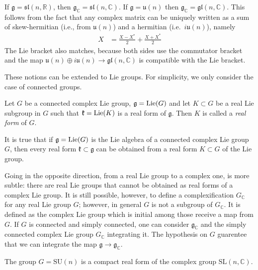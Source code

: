 \documentclass[12pt]{article}
\begin{document}
\begin{example}
    If
    $\mathfrak g=\mathfrak{sl}(n,\mathbb R)$, then
    $\mathfrak g_{\mathbb C}=\mathfrak{sl}(n,\mathbb C)$.
    If $\mathfrak g=\mathfrak u(n)$ then $\mathfrak g_{\mathbb C}
        =\mathfrak{gl}(n,\mathbb C)$. This follows from the fact that any complex matrix can be uniquely written as a sum of skew-hermitian (i.e., from $\mathfrak u(n)$) and a hermitian (i.e.\ $i\mathfrak u(n)$), namely \begin{align*}
        X & = \frac{X - X^*}{2} + \frac{X + X^*}{2}
    \end{align*}
    The Lie bracket also matches, because both sides use the commutator bracket and the map $\mathfrak u(n) \oplus i\mathfrak u(n) \to \mathfrak{gl}(n,\mathbb C)$ is compatible with the Lie bracket.
\end{example}

These notions can be extended to Lie groups. For simplicity, we only consider
the case of connected groups.

\begin{definition}
    Let $G$ be a connected complex Lie group, $\mathfrak g=\operatorname{Lie}(G)$ and let
    $K\subset G$ be a real Lie subgroup in $G$ such that
    $\mathfrak k=\operatorname{Lie}(K)$ is a real form of $\mathfrak g$. Then $K$ is called
    a \emph{real form} of $G$.
\end{definition}

It is true that if $\mathfrak g=\operatorname{Lie}(G)$ is the Lie
algebra of a connected complex Lie group $G$, then every real form $\mathfrak k\subset \mathfrak g$ can be obtained from a real form $K\subset G$ of the Lie group.

Going in the opposite direction, from a real Lie group to a complex one, is more
subtle: there are real Lie groups that cannot be obtained as real forms of a
complex Lie group. It is still possible, however, to define a complexification
$G_{\mathbb C}$ for any real Lie group $G$; however, in general $G$ is not a
subgroup of $G_{\mathbb C}$. It is defined as the complex Lie group which is initial among those receive a map from $G$. If $G$ is connected and simply connected, one can consider $\mathfrak g_{\mathbb C}$ and the simply connected complex Lie group $G_{\mathbb C}$ integrating it. The hypothesis on $G$ guarentee that we can integrate the map $\mathfrak g \to \mathfrak g_{\mathbb C}$.

\begin{example}
    The group $G=\mathrm{SU}(n)$ is a compact real form of the complex group $\mathrm{SL}(n,\mathbb C)$.
\end{example}
\end{document}
